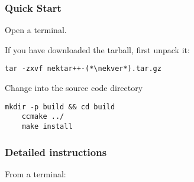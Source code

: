 \subsubsection{Quick Start}
Open a terminal.

If you have downloaded the tarball, first unpack it:
\begin{lstlisting}[style=BashInputStyle]
tar -zxvf nektar++-(*\nekver*).tar.gz
\end{lstlisting}
Change into the  source code directory
\begin{lstlisting}[style=BashInputStyle]
    mkdir -p build && cd build
    ccmake ../
    make install
\end{lstlisting}

\subsubsection{Detailed instructions}
From a terminal:
